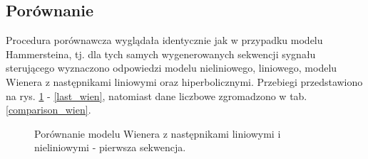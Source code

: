\newpage

\subsection{Porównanie}

Procedura porównawcza wyglądała identycznie jak w przypadku modelu Hammersteina, tj. dla tych samych wygenerowanych sekwencji sygnału sterującego wyznaczono odpowiedzi modelu nieliniowego, liniowego, modelu Wienera z następnikami liniowymi oraz hiperbolicznymi. Przebiegi przedstawiono na rys. \ref{first_wien} - \ref{last_wien}, natomiast dane liczbowe zgromadzono w tab. \ref{comparison_wien}.

\begin{figure}[h!]
\centering
{}
\vspace{0.5cm}
\caption{Porównanie modelu Wienera z następnikami liniowymi i nieliniowymi - pierwsza sekwencja.}
\label{first_wien}
\end{figure}

